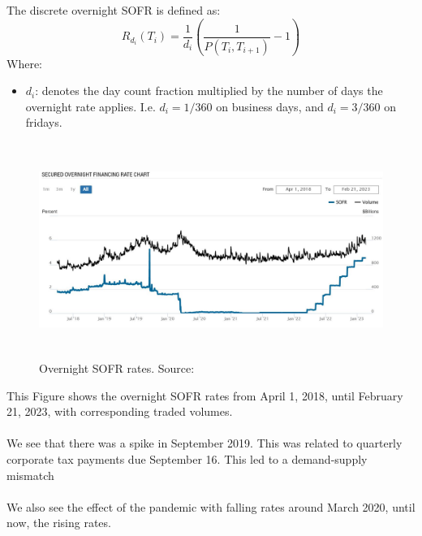 \newpage 

\begin{definition}
The discrete overnight SOFR is defined as:
\[
R_{d_{i}}(T_{i}) = \frac{1}{d_{i}}\left(
\frac{1}{P(T_{i}, T_{i+1})} - 1
\right)
\]
Where:
\begin{itemize}[leftmargin=*]
    \item $d_{i}$: denotes the day count fraction multiplied by the number of days the overnight rate applies. I.e. $d_{i} = 1/360$ on business days, and $d_{i} = 3/360$ on fridays. 
\end{itemize}
\end{definition}


\begin{figure}[htp]
    \centering
    \includegraphics[height = 7cm, width=14cm]{figures/SOFR/overnight_SOFR_Volume.JPG}
    \caption{Overnight SOFR rates. Source: \cite{NewYorkFedSOFR}}
    \label{fig: Overnight_SOFR_rates}
\end{figure}

This Figure shows the overnight SOFR rates from April 1, 2018, until February 21, 2023, with corresponding traded volumes. 
\\~\\
We see that there was a spike in September 2019. This was related to quarterly corporate tax payments due September 16. This led to a demand-supply mismatch  \cite{FederalReserve2019}
\\~\\ 
We also see the effect of the pandemic with falling rates around March 2020, until now, the rising rates. 


\newpage 

